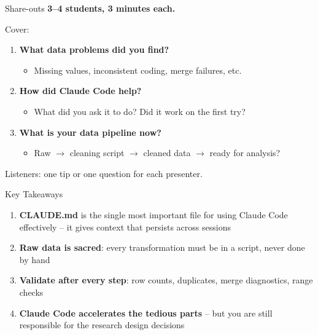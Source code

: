 
\begin{frame}{Share-outs}
  \textbf{3--4 students, 3 minutes each.}

  \vspace{12pt}

  Cover:
  \begin{enumerate}
    \item \textbf{What data problems did you find?}
    \begin{itemize}
      \item Missing values, inconsistent coding, merge failures, etc.
    \end{itemize}
    \item \textbf{How did Claude Code help?}
    \begin{itemize}
      \item What did you ask it to do? Did it work on the first try?
    \end{itemize}
    \item \textbf{What is your data pipeline now?}
    \begin{itemize}
      \item Raw $\to$ cleaning script $\to$ cleaned data $\to$ ready for analysis?
    \end{itemize}
  \end{enumerate}

  \vspace{12pt}

  Listeners: one tip or one question for each presenter.
\end{frame}

\begin{frame}{Key Takeaways}
  \begin{enumerate}
    \item \textbf{CLAUDE.md} is the single most important file for using Claude Code effectively -- it gives context that persists across sessions

    \vspace{4pt}

    \item \textbf{Raw data is sacred}: every transformation must be in a script, never done by hand

    \vspace{4pt}

    \item \textbf{Validate after every step}: row counts, duplicates, merge diagnostics, range checks

    \vspace{4pt}

    \item \textbf{Claude Code accelerates the tedious parts} -- but you are still responsible for the research design decisions
  \end{enumerate}
\end{frame}

